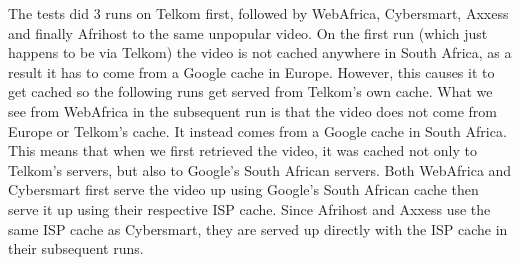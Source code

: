 \documentclass{sig-alternate-05-2015}
\begin{document}
\begin{table}
	\caption{Latency to unpopular YouTube video}
	\label{table:LatencyToUnpopularYouTubeVideo}
\end{table}

\begin{table*}
	\centering
	\caption{Organisation managing IP to unpopular YouTube video}
	\label{table:OrgHostingUnpopularYouTubeVideo}
	\end{table*}

The tests did 3 runs on Telkom first, followed by WebAfrica, Cybersmart, Axxess and finally Afrihost to the same unpopular video. On the first run (which just happens to be via Telkom) the video is not cached anywhere in South Africa, as a result it has to come from a Google cache in Europe. However, this causes it to get cached so the following runs get served from Telkom's own cache. What we see from WebAfrica in the subsequent run is that the video does not come from Europe or Telkom's cache. It instead comes from a Google cache in South Africa. This means that when we first retrieved the video, it was cached not only to Telkom's servers, but also to Google's South African servers. Both WebAfrica and Cybersmart first serve the video up using Google's South African cache then serve it up using their respective ISP cache. Since Afrihost and Axxess use the same ISP cache as Cybersmart, they are served up directly with the ISP cache in their subsequent runs. 
\end{document}
